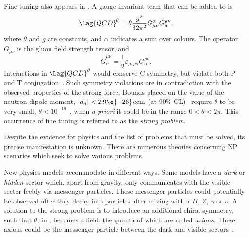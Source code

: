 Fine tuning also appears in \QCD.
A gauge invariant term that can be added to  is
\begin{equation}
  \Lag{QCD}^\theta = \theta\frac{g^2}{32\pi^2}
  G_{\mu\nu}^\alpha\widetilde G^{\mu\nu}_\alpha,
  \label{eq:strongcp}
\end{equation}
where $\theta$ and $g$ are constants, and $\alpha$ indicates a sum over colours.
The operator $G_{\mu\nu}$ is the gluon field strength tensor, and
\begin{equation}
  \widetilde G^{\mu\nu}_\alpha = \frac12\varepsilon_{\mu\nu\rho\sigma}G^{\rho\sigma}_\alpha.
\end{equation}
Interactions in $\Lag{QCD}^\theta$ would conserve \gls{C} symmetry, but violate both \gls{P} and
\gls{T} conjugation~\cite{Peccei:2006as}.
Such symmetry violations are in contradiction with the observed properties of the strong
force.
Bounds placed on the value of the neutron dipole moment, $|d_n| <2.9\e{-26}\,\mathrm{ecm}$
(at 90\% CL)~\cite{Baker:2006ts} require $\theta$ to be very small,
$\theta<10^{-19}$~\cite{Crewther:PQref9}, when \emph{a priori} it could be in the range
$0<\theta<2\pi$.
This occurrence of fine tuning is referred to as the \emph{strong \CP problem}.


Despite the evidence for \bsm physics and the list of problems that must be solved, its precise
manifestation is unknown.
There are numerous theories concerning NP scenarios which seek to solve various problems.

New physics models accommodate \dm in different ways.
Some models have a \emph{dark} or \emph{hidden} sector which, apart from gravity, only
communicates with the visible sector feebly via messenger particles.
These messenger particles could potentially be observed after they decay into \sm particles after
mixing with a $H$, $Z$, $\gamma$ or $\nu$.
A solution to the strong \CP problem is to introduce an additional chiral symmetry, such that
$\theta$, in , becomes a field: the quanta of which are called \emph{axions}.
These axions could be the messenger particle between the dark and visible
sectors~\cite{Peccei:2006as}.





